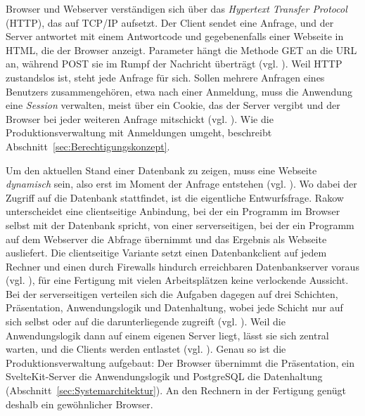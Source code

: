 Browser und Webserver verständigen sich über das \emph{Hypertext Transfer
Protocol} (HTTP), das auf TCP/IP aufsetzt. Der Client sendet eine Anfrage, und
der Server antwortet mit einem Antwortcode und gegebenenfalls einer Webseite in
HTML, die der Browser anzeigt. Parameter hängt die Methode GET an die URL an,
während POST sie im Rumpf der Nachricht überträgt (vgl.
\cite[S.~198]{kudrassTaschenbuchDatenbankenImWeb}). Weil HTTP zustandslos ist,
steht jede Anfrage für sich. Sollen mehrere Anfragen eines Benutzers
zusammengehören, etwa nach einer Anmeldung, muss die Anwendung eine
\emph{Session} verwalten, meist über ein Cookie, das der Server vergibt und der
Browser bei jeder weiteren Anfrage mitschickt (vgl.
\cite[S.~199\,f.]{kudrassTaschenbuchDatenbankenImWeb}). Wie die
Produktionsverwaltung mit Anmeldungen umgeht, beschreibt
Abschnitt~\ref{sec:Berechtigungskonzept}.

Um den aktuellen Stand einer Datenbank zu zeigen, muss eine Webseite
\emph{dynamisch} sein, also erst im Moment der Anfrage entstehen (vgl.
\cite[S.~195]{kudrassTaschenbuchDatenbankenImWeb}). Wo dabei der Zugriff auf die
Datenbank stattfindet, ist die eigentliche Entwurfsfrage. Rakow unterscheidet
eine clientseitige Anbindung, bei der ein Programm im Browser selbst mit der
Datenbank spricht, von einer serverseitigen, bei der ein Programm auf dem
Webserver die Abfrage übernimmt und das Ergebnis als Webseite ausliefert. Die
clientseitige Variante setzt einen Datenbankclient auf jedem Rechner und einen
durch Firewalls hindurch erreichbaren Datenbankserver voraus (vgl.
\cite[S.~206\,f., 212]{kudrassTaschenbuchDatenbankenImWeb}), für eine Fertigung
mit vielen Arbeitsplätzen keine verlockende Aussicht. Bei der serverseitigen
verteilen sich die Aufgaben dagegen auf drei Schichten, Präsentation,
Anwendungslogik und Datenhaltung, wobei jede Schicht nur auf sich selbst oder
auf die darunterliegende zugreift (vgl.
\cite[S.~201]{kudrassTaschenbuchDatenbankenImWeb}). Weil die Anwendungslogik
dann auf einem eigenen Server liegt, lässt sie sich zentral warten, und die
Clients werden entlastet (vgl.
\cite[S.~150]{kudrassTaschenbuchDatenbankenAnwendungsPro}). Genau so ist die
Produktionsverwaltung aufgebaut: Der Browser übernimmt die Präsentation, ein
SvelteKit-Server die Anwendungslogik und PostgreSQL die Datenhaltung
(Abschnitt~\ref{sec:Systemarchitektur}). An den Rechnern in der Fertigung
genügt deshalb ein gewöhnlicher Browser.

